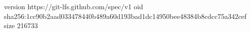version https://git-lfs.github.com/spec/v1
oid sha256:1cc90b2aad033478440b489a60d193bad1dc14950bee48384b8cdcc75a342cef
size 216733
